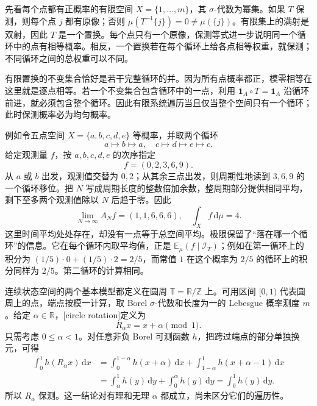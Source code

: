 先看每个点都有正概率的有限空间 \(X=\{1,\ldots,m\}\)，其 \(\sigma\)-代数为幂集。如果 \(T\) 保测，则每个点 \(j\) 都有原像；否则 \(\mu(T^{-1}\{j\})=0\ne\mu(\{j\})\)。有限集上的满射是双射，因此 \(T\) 是一个置换。每个点只有一个原像，保测等式进一步说明同一个循环中的点有相等概率。相反，一个置换若在每个循环上给各点相等权重，就保测；不同循环之间的总权重可以不同。

\ProseParagraphBreak

有限置换的不变集合恰好是若干完整循环的并。因为所有点概率都正，模零相等在这里就是逐点相等。若一个不变集合包含循环中的一点，利用 \(\mathbf1_A\circ T=\mathbf1_A\) 沿循环前进，就必须包含整个循环。因此有限系统遍历当且仅当整个空间只有一个循环；此时保测概率必为均匀概率。

\ProseParagraphBreak

例如令五点空间 \(X=\{a,b,c,d,e\}\) 等概率，并取两个循环
\[
 a\longmapsto b\longmapsto a,\quad
 c\longmapsto d\longmapsto e\longmapsto c.
\]
给定观测量 \(f\)，按 \(a,b,c,d,e\) 的次序指定
\[
 f=(0,2,3,6,9).
\]
从 \(a\) 或 \(b\) 出发，观测值交替为 \(0,2\)；从其余三点出发，则周期性地读到 \(3,6,9\) 的一个循环移位。把 \(N\) 写成周期长度的整数倍加余数，整周期部分提供相同平均，剩下至多两个观测值除以 \(N\) 后趋于零。因此
\[
 \lim_{N\to\infty}A_Nf=(1,1,6,6,6),\quad
 \int_X f\,\mathrm d\mu=4.
\]
这里时间平均处处存在，却没有一点等于总空间平均。极限保留了“落在哪一个循环”的信息。它在每个循环内取平均值，正是 \(\mathbb E_\mu(f\mid\mathcal I_T)\)；例如在第一循环上的积分为 \((1/5)\cdot0+(1/5)\cdot2=2/5\)，而常值 \(1\) 在这个概率为 \(2/5\) 的循环上的积分同样为 \(2/5\)。第二循环的计算相同。

\ProseParagraphBreak

连续状态空间的两个基本模型都定义在圆周 \(\mathbb T=\mathbb R/\mathbb Z\) 上。可用区间 \([0,1)\) 代表圆周上的点，端点按模一计算，取 Borel \(\sigma\)-代数和长度为一的 Lebesgue 概率测度 \(m\)。给定 \(\alpha\in\mathbb R\)，[circle rotation]定义为
\[
 R_\alpha x=x+\alpha\pmod1.
\]
只需考虑 \(0\leq\alpha<1\)。对任意非负 Borel 可测函数 \(h\)，把跨过端点的部分单独换元，可得
\[
 \begin{aligned}
 \int_0^1 h(R_\alpha x)\,\mathrm dx
 &=\int_0^{1-\alpha}h(x+\alpha)\,\mathrm dx
   +\int_{1-\alpha}^1h(x+\alpha-1)\,\mathrm dx\\
 &=\int_\alpha^1h(y)\,\mathrm dy+\int_0^\alpha h(y)\,\mathrm dy
 =\int_0^1h(y)\,\mathrm dy.
 \end{aligned}
\]
所以 \(R_\alpha\) 保测。这一结论对有理和无理 \(\alpha\) 都成立，尚未区分它们的遍历性。

